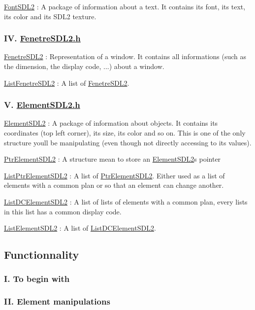 \begin{DoxyEnumerate}
\item \hyperlink{structFontSDL2}{Font\+S\+D\+L2} \+: A package of information about a text. It contains its font, its text, its color and its S\+D\+L2 texture.
\end{DoxyEnumerate}

\subsubsection*{IV. \hyperlink{FenetreSDL2_8h}{Fenetre\+S\+D\+L2.\+h}}


\begin{DoxyEnumerate}
\item \hyperlink{structFenetreSDL2}{Fenetre\+S\+D\+L2} \+: Representation of a window. It contains all informations (such as the dimension, the display code, ...) about a window.
\item \hyperlink{structListFenetreSDL2}{List\+Fenetre\+S\+D\+L2} \+: A list of \hyperlink{structFenetreSDL2}{Fenetre\+S\+D\+L2}.
\end{DoxyEnumerate}

\subsubsection*{V. \hyperlink{ElementSDL2_8h}{Element\+S\+D\+L2.\+h}}


\begin{DoxyEnumerate}
\item \hyperlink{structElementSDL2}{Element\+S\+D\+L2} \+: A package of information about objects. It contains its coordinates (top left corner), its size, its color and so on. This is one of the only structure you\textquotesingle{}ll be manipulating (even though not directly accessing to its values).
\item \hyperlink{structPtrElementSDL2}{Ptr\+Element\+S\+D\+L2} \+: A structure mean to store an \hyperlink{structElementSDL2}{Element\+S\+D\+L2}\textquotesingle{}s pointer
\item \hyperlink{structListPtrElementSDL2}{List\+Ptr\+Element\+S\+D\+L2} \+: A list of \hyperlink{structPtrElementSDL2}{Ptr\+Element\+S\+D\+L2}. Either used as a list of elements with a common plan or so that an element can change another.
\item \hyperlink{structListDCElementSDL2}{List\+D\+C\+Element\+S\+D\+L2} \+: A list of lists of elements with a common plan, every lists in this list has a common display code.
\item \hyperlink{structListElementSDL2}{List\+Element\+S\+D\+L2} \+: A list of \hyperlink{structListDCElementSDL2}{List\+D\+C\+Element\+S\+D\+L2}.
\end{DoxyEnumerate}

\subsection*{Functionnality}

\subsubsection*{I. To begin with}

\subsubsection*{II. Element manipulations}